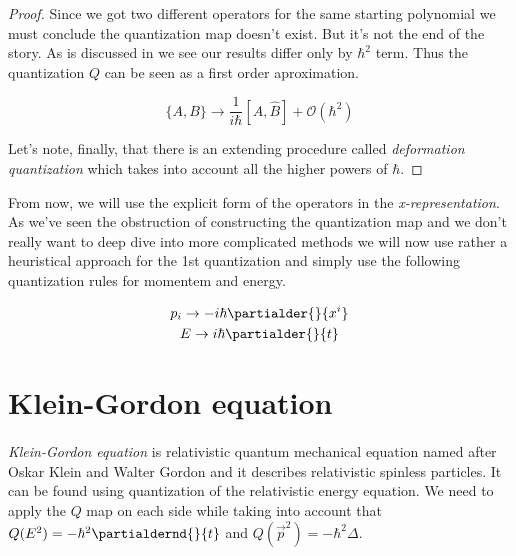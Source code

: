 \begin{proof}
    Since we got two different operators for the same starting polynomial we must conclude the quantization map doesn't exist. But
    it's not the end of the story. As is discussed in \cite{floarin_jung} we see our results differ only by $\hbar^{2}$ term. Thus
    the quantization $Q$ can be seen as a first order aproximation.

    \begin{equation}
        \label{eq:dirac_quantization}
        \{A, B\} \to \frac{1}{i \hbar}[\hat{A}, \hat{B}] + \mathcal{O}(\hbar^{2})
    \end{equation}

    Let's note, finally, that there is an extending procedure called \textit{deformation quantization} which takes into
    account all the higher powers of $\hbar$.

\end{proof}

From now, we will use the explicit form of the operators in the \textit{x-representation}. As we've seen the obstruction of
constructing the quantization map and we don't really want to deep dive into more complicated methods we will now use rather
a heuristical approach for the 1st quantization and simply use the following quantization rules for momentem and energy.

\begin{equation}
    \begin{gathered}
        p_{i} \to - i \hbar \partialder{}{x^{i}} \\
        E \to i \hbar \partialder{}{t}
    \end{gathered}
\end{equation}


\section{Klein-Gordon equation}

\paragraph{} \textit{Klein-Gordon equation} is relativistic quantum mechanical equation named after Oskar Klein and Walter Gordon and
it describes relativistic spinless particles. It can be found using quantization of the relativistic energy equation. We need to apply the
$Q$ map on each side while taking into account that $Q(E^2) = - \hbar^{2} \partialdernd{}{t}$ and 
$Q(\vec{p}^2) = - \hbar^{2} \Delta$.

